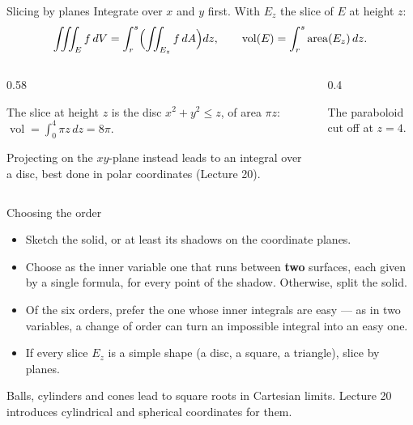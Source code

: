 \documentclass[10pt]{wosm-slides}
\newcommand{\dA}{\, dA}
\newcommand{\dV}{\, dV}
\begin{document}
\begin{frame}{Slicing by planes}
  Integrate over $x$ and $y$ first. With $E_z$ the slice of $E$ at height $z$:
  \[ \iiint_E f \dV = \int_r^s \Bigl( \iint_{E_z} f \dA \Bigr) dz , \qquad
     \operatorname{vol}(E) = \int_r^s \operatorname{area}(E_z)\, dz . \]
  \pause
  \begin{columns}[c]
    \begin{column}{0.58\textwidth}
      \begin{example}[Under $z = 4$, above $z = x^2 + y^2$]
        The slice at height $z$ is the disc $x^2 + y^2 \le z$, of area $\pi z$:
        \ $\operatorname{vol} = \int_0^4 \pi z\, dz = 8\pi$.
      \end{example}
      {\small Projecting on the $xy$-plane instead leads to an integral over a disc, best done in polar
      coordinates (Lecture 20).\par}
    \end{column}
    \begin{column}{0.4\textwidth}
      \centering
      \par\small The paraboloid cut off at $z = 4$.
    \end{column}
  \end{columns}
\end{frame}

\begin{frame}{Choosing the order}
  \begin{itemize}
    \item Sketch the solid, or at least its shadows on the coordinate planes.
    \item Choose as the inner variable one that runs between \textbf{two} surfaces, each given by a
      single formula, for every point of the shadow. Otherwise, split the solid.
    \item Of the six orders, prefer the one whose inner integrals are easy --- as in two variables, a
      change of order can turn an impossible integral into an easy one.
    \item If every slice $E_z$ is a simple shape (a disc, a square, a triangle), slice by planes.
  \end{itemize}
  \pause
  \begin{warning}
    Balls, cylinders and cones lead to square roots in Cartesian limits. Lecture 20 introduces
    cylindrical and spherical coordinates for them.
  \end{warning}
\end{frame}
\end{document}
